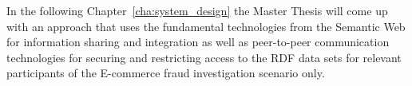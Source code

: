 In the following Chapter~\ref{cha:system_design} the Master Thesis will come up with an approach that uses the fundamental technologies from the Semantic Web for information sharing and integration as well as peer-to-peer communication technologies for securing and restricting access to the \gls{RDF} data sets for relevant participants of the \gls{E-commerce} fraud investigation scenario only.

